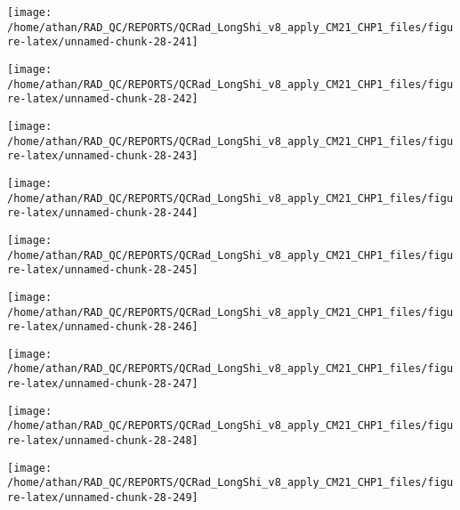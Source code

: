 \documentclass[
  10pt,
  a4paper,oneside]{article}
\begin{document}
\begin{center}\texttt{[image: /home/athan/RAD\_QC/REPORTS/QCRad\_LongShi\_v8\_apply\_CM21\_CHP1\_files/figure-latex/unnamed-chunk-28-241]} \end{center}

\begin{center}\texttt{[image: /home/athan/RAD\_QC/REPORTS/QCRad\_LongShi\_v8\_apply\_CM21\_CHP1\_files/figure-latex/unnamed-chunk-28-242]} \end{center}

\begin{center}\texttt{[image: /home/athan/RAD\_QC/REPORTS/QCRad\_LongShi\_v8\_apply\_CM21\_CHP1\_files/figure-latex/unnamed-chunk-28-243]} \end{center}

\begin{center}\texttt{[image: /home/athan/RAD\_QC/REPORTS/QCRad\_LongShi\_v8\_apply\_CM21\_CHP1\_files/figure-latex/unnamed-chunk-28-244]} \end{center}

\begin{center}\texttt{[image: /home/athan/RAD\_QC/REPORTS/QCRad\_LongShi\_v8\_apply\_CM21\_CHP1\_files/figure-latex/unnamed-chunk-28-245]} \end{center}

\begin{center}\texttt{[image: /home/athan/RAD\_QC/REPORTS/QCRad\_LongShi\_v8\_apply\_CM21\_CHP1\_files/figure-latex/unnamed-chunk-28-246]} \end{center}

\begin{center}\texttt{[image: /home/athan/RAD\_QC/REPORTS/QCRad\_LongShi\_v8\_apply\_CM21\_CHP1\_files/figure-latex/unnamed-chunk-28-247]} \end{center}

\begin{center}\texttt{[image: /home/athan/RAD\_QC/REPORTS/QCRad\_LongShi\_v8\_apply\_CM21\_CHP1\_files/figure-latex/unnamed-chunk-28-248]} \end{center}

\begin{center}\texttt{[image: /home/athan/RAD\_QC/REPORTS/QCRad\_LongShi\_v8\_apply\_CM21\_CHP1\_files/figure-latex/unnamed-chunk-28-249]} \end{center}
\end{document}
